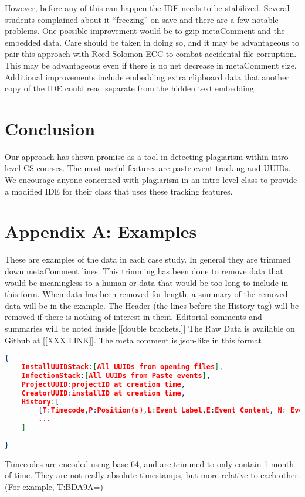 \documentclass[conference]{IEEEtran}
\newcommand{\n}{\hfill\break}
\newcommand{\metaComment}{metaComment\xspace}
\begin{document}
However, before any of this can happen the IDE needs to be stabilized.  Several students complained about it ``freezing'' on save and there are a few notable problems.  One possible improvement would be to gzip \metaComment and the embedded data.  Care should be taken in doing so, and it may be advantageous to pair this approach with Reed-Solomon ECC to combat accidental file corruption.  This may be advantageous even if there is no net decrease in \metaComment size.  Additional improvements include embedding extra clipboard data that another copy of the IDE could read separate from the hidden text embedding
\n\section{\textbf{Conclusion}}
Our approach has shown promise as a tool in detecting plagiarism within intro level CS courses.  The most useful features are paste event tracking and UUIDs.  We encourage anyone concerned with plagiarism in an intro level class to provide a modified IDE for their class that uses these tracking features.

{}
 

\section{\textbf{Appendix A: Examples}}
These are examples of the data in each case study.  In general they are trimmed down \metaComment lines.  This trimming has been done to remove data that would be meaningless to a human or data that would be too long to include in this form.  When data has been removed for length, a summary of the removed data will be in the example.  The Header (the lines before the History tag) will be removed if there is nothing of interest in them.  Editorial comments and summaries will be noted inside [[double brackets.]]
The Raw Data is available on Github at [[XXX LINK]].
The meta comment is json-like in this format
\begin{lstlisting}[language=JSON]
{
	InstallUUIDStack:[All UUIDs from opening files],
	InfectionStack:[All UUIDs from Paste events],
	ProjectUUID:projectID at creation time,
	CreatorUUID:installID at creation time,
	History:[
		{T:Timecode,P:Position(s),L:Event Label,E:Event Content, N: Event Notes},
		...
	]
	
}
\end{lstlisting}
Timecodes are encoded using base 64, and are trimmed to only contain 1 month of time.  They are not really absolute timestamps, but more relative to each other. (For example, T:BDA9A=)
\end{document}
